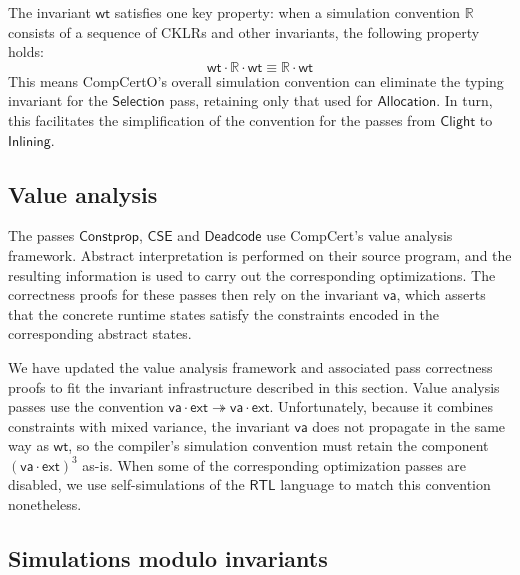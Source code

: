 \documentclass[11pt,oneside,draft]{book}
\theoremstyle{definition}
\newcommand{\kw}[1]{\ensuremath{ \mathsf{#1} }}
\begin{document}
The invariant $\kw{wt}$ satisfies one key property:
when a simulation convention $\mathbb{R}$
consists of a sequence of CKLRs and other invariants,
the following property holds:
\[
  \kw{wt} \cdot \mathbb{R} \cdot \kw{wt} \equiv
  \mathbb{R} \cdot \kw{wt}
\]
This means CompCertO's overall simulation convention
can eliminate the typing invariant for the $\kw{Selection}$ pass,
retaining only that used for $\kw{Allocation}$.
In turn, this facilitates the simplification of the convention for
the passes from \kw{Clight} to \kw{Inlining}.


\subsection{Value analysis} \label{sec:va} %

The passes
$\kw{Constprop}$, $\kw{CSE}$ and $\kw{Deadcode}$
use CompCert's value analysis framework.
Abstract interpretation is performed %
on their source program,
and the resulting information is used to carry out
the corresponding optimizations.
The correctness proofs for these passes then rely
on the invariant $\kw{va}$,
which asserts that the concrete runtime states
satisfy the constraints encoded in the corresponding
abstract states.

We have updated the value analysis framework
and associated pass correctness proofs
to fit the invariant infrastructure described in this section.
Value analysis passes use the convention
$\kw{va} \cdot \kw{ext} \twoheadrightarrow \kw{va} \cdot \kw{ext}$.
Unfortunately,
because it combines constraints with mixed variance,
the invariant $\kw{va}$ does not propagate in the same way as $\kw{wt}$,
so the compiler's simulation convention must retain
the component $(\kw{va} \cdot \kw{ext})^3$ as-is.
When some of the corresponding optimization passes are disabled,
we use self-simulations of the $\kw{RTL}$ language
to match this convention nonetheless.


\subsection{Simulations modulo invariants} \label{sec:fsim-inv} %
\end{document}

